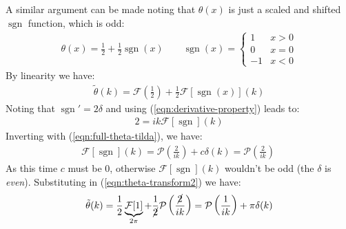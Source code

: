\documentclass[../template.tex]{subfiles}
\begin{document}
A similar argument can be made noting that $\theta(x)$ is just a scaled and shifted $\operatorname{sgn}$ function, which is odd:
\begin{align*}
    \theta(x) = \frac{1}{2} +  \frac{1}{2}\operatorname{sgn}(x) \qquad
    \operatorname{sgn}(x) = \begin{cases}
        1 & x > 0\\
        0 & x = 0\\
        -1 & x < 0
    \end{cases} 
\end{align*} 
By linearity we have:
\begin{align}
    \tilde{\theta}(k) = \mathcal{F}\left(\frac{1}{2}\right) + \frac{1}{2} \mathcal{F}[\operatorname{sgn}(x)](k) \label{eqn:theta-transform2}
\end{align}
Noting that $\operatorname{sgn}' = 2 \delta$ and using (\ref{eqn:derivative-property}) leads to:
\begin{align*}
    2 = ik \mathcal{F}[\operatorname{sgn}](k)
\end{align*}
Inverting with (\ref{eqn:full-theta-tilda}), we have:
\begin{align*}
    \mathcal{F}[\operatorname{sgn}](k) = \mathcal{P}\left(\frac{2}{ik} \right) + c \delta(k) =\mathcal{P}\left(\frac{2}{ik} \right) \ 
\end{align*}
As this time $c$ must be $0$, otherwise $\mathcal{F}[\operatorname{sgn}](k)$ wouldn't be odd (the $\delta$ is \textit{even}). Substituting in (\ref{eqn:theta-transform2}) we have:
\begin{align*}
    \tilde{\theta}(k) = \frac{1}{2} \underbrace{\mathcal{F}[1] }_{2 \pi}+\frac{1}{\cancel{2}} \mathcal{P}\left(\frac{\cancel{2}}{ik} \right) = \mathcal{P}\left(\frac{1}{ik} \right)  + \pi \delta(k)
\end{align*}
\end{document}
